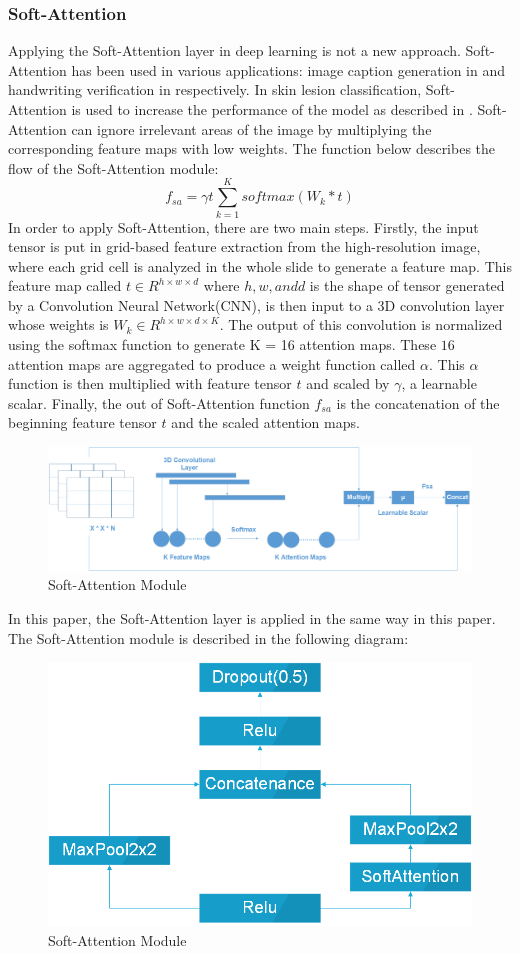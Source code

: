 \subsubsection{Soft-Attention}
Applying the Soft-Attention layer in deep learning is not a new approach. Soft-Attention has been used in various applications: image caption generation in \cite{03044} and handwriting verification in \cite{202017} respectively. In skin lesion classification, Soft-Attention is used to increase the performance of the model as described in \cite{03358}. Soft-Attention can ignore irrelevant areas of the image by multiplying the corresponding feature maps with low weights. The function below describes the flow of the Soft-Attention module:
\[
f_{sa} = \gamma t\sum_{k=1}^{K}softmax(W_k * t)
\]
In order to apply Soft-Attention, there are two main steps. Firstly, the input tensor is put in grid-based feature extraction from the high-resolution image, where each grid cell is analyzed in the whole slide to generate a feature map\cite{08513}. This feature map called $t \in R^{h \times w \times d}$ where $h, w, and d$ is the shape of tensor generated by a Convolution Neural Network(CNN), is then input to a 3D convolution layer whose weights is $W_k \in R^{h \times w \times d \times K}$. The output of this convolution is normalized using the softmax function to generate K = 16 attention maps. These $16$ attention maps are aggregated to produce a weight function called $\alpha$. This $\alpha$ function is then multiplied with feature tensor $t$ and scaled by $\gamma$, a learnable scalar. Finally, the out of Soft-Attention function $f_{sa}$ is the concatenation of the beginning feature tensor $t$ and the scaled attention maps. 
\begin{figure}[h]
	\centering
	\includegraphics[width=1\linewidth]{Diagram/SoftAttention}
	\caption{Soft-Attention Module}
	\label{fig:softattention}
\end{figure}
In this paper, the Soft-Attention layer is applied in the same way in this paper\cite{03358}. The Soft-Attention module is described in the following diagram:
\begin{figure}[h]
	\centering
	\includegraphics[width=0.5\linewidth]{Diagram/SoftAttentionBlock}
	\caption{Soft-Attention Module}
	\label{fig:softattentionblock}
\end{figure}\\

